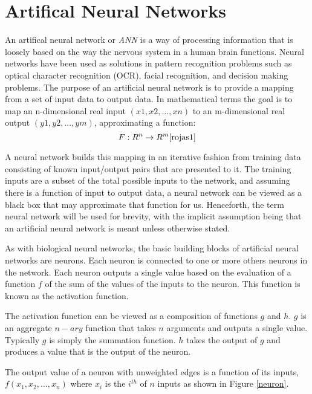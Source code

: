 \section{Artifical Neural Networks}
An artifical neural network or {\it ANN} is a way of processing
information that is loosely based on the way the nervous system in a
human brain functions.
Neural networks have been used as solutions in pattern recognition
problems such as optical character recognition (OCR)\cite{ocr1,ocr2},
facial recognition\cite{face},  and decision making problems\cite{decisionMaking1,decisionMaking2}.
The purpose of an artificial neural network is to provide a mapping from a set of input data to output data. 
In mathematical terms the goal is to map an n-dimensional real input
$(x1,x2,...,xn)$ to an m-dimensional real output $(y1,y2,...,ym)$, 
approximating a function: 
\begin{displaymath} F : R^n \rightarrow R^m
  \cite{rojas1}\end{displaymath}

A neural network builds this mapping in an iterative fashion from training data consisting of known input/output pairs that are presented to it. 
The training inputs are a subset of the total possible inputs to the network, and assuming there is a function of input to output data, a neural network can be viewed as a black box that may approximate that function for us.
Henceforth, the term neural network will be used for brevity, with the implicit assumption being that an artificial neural network is meant unless otherwise stated.

As with biological neural networks, the basic building blocks of artificial neural networks are neurons. 
Each neuron is connected to one or more others neurons in the network. 
Each neuron outputs a single value based on the evaluation of a function $f$ of the sum of the values of the inputs to the neuron.
This function is known as the activation function.

The activation function can be viewed as a composition of functions
$g$ and $h$.
$g$ is an aggregate $n-ary$ function that takes $n$ arguments and outputs a
single value.
Typically $g$ is simply the summation function.
$h$ takes the output of $g$ and produces a value that is the output of
the neuron. 

The output value of a neuron with unweighted edges is a function of
its inputs, $f(x_1, x_2, ..., x_n)$ where $x_i$ is the $i^{th}$ of $n$
inputs as shown in Figure \ref{neuron}.

